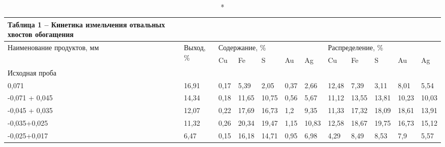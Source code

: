 {\small
\begin{longtable}[c]{|p{}lllllllllll|}
\caption*{Таблица 1 -- Кинетика измельчения отвальных хвостов обогащения} \\
\hline
\multicolumn{1}{|p{0.15\textwidth}|}{\multirow{2}{=}{Наименование продуктов, мм}} & \multicolumn{1}{p{0.06\textwidth}|}{\multirow{2}{=}{Выход, \%}} & \multicolumn{5}{l|}{Содержание, \%} & \multicolumn{5}{l|}{Распределение, \%} \\ \cline{3-12} 
\multicolumn{1}{|l|}{} & \multicolumn{1}{l|}{} & \multicolumn{1}{l|}{Cu} & \multicolumn{1}{l|}{Fe} & \multicolumn{1}{l|}{S} & \multicolumn{1}{l|}{Au} & \multicolumn{1}{l|}{Ag} & \multicolumn{1}{l|}{Cu} & \multicolumn{1}{l|}{Fe} & \multicolumn{1}{l|}{S} & \multicolumn{1}{l|}{Au} & Ag \\ \hline
\endfirsthead
%
\endhead
%
\multicolumn{12}{|l|}{Исходная проба} \\ \hline
\multicolumn{1}{|l|}{0,071} & \multicolumn{1}{l|}{16,91} & \multicolumn{1}{l|}{0,17} & \multicolumn{1}{l|}{5,39} & \multicolumn{1}{l|}{2,05} & \multicolumn{1}{l|}{0,37} & \multicolumn{1}{l|}{2,66} & \multicolumn{1}{l|}{12,48} & \multicolumn{1}{l|}{7,39} & \multicolumn{1}{l|}{3,11} & \multicolumn{1}{l|}{8,01} & 5,54 \\ \hline
\multicolumn{1}{|l|}{-0,071 + 0,045} & \multicolumn{1}{l|}{14,34} & \multicolumn{1}{l|}{0,18} & \multicolumn{1}{l|}{11,65} & \multicolumn{1}{l|}{10,75} & \multicolumn{1}{l|}{0,56} & \multicolumn{1}{l|}{5,67} & \multicolumn{1}{l|}{11,12} & \multicolumn{1}{l|}{13,55} & \multicolumn{1}{l|}{13,81} & \multicolumn{1}{l|}{10,23} & 10,03 \\ \hline
\multicolumn{1}{|l|}{-0,045 + 0,035} & \multicolumn{1}{l|}{12,07} & \multicolumn{1}{l|}{0,22} & \multicolumn{1}{l|}{17,69} & \multicolumn{1}{l|}{16,73} & \multicolumn{1}{l|}{1,2} & \multicolumn{1}{l|}{9,35} & \multicolumn{1}{l|}{11,33} & \multicolumn{1}{l|}{17,32} & \multicolumn{1}{l|}{18,09} & \multicolumn{1}{l|}{18,61} & 13,91 \\ \hline
\multicolumn{1}{|l|}{-0,035+0,025} & \multicolumn{1}{l|}{11,32} & \multicolumn{1}{l|}{0,26} & \multicolumn{1}{l|}{20,34} & \multicolumn{1}{l|}{19,47} & \multicolumn{1}{l|}{1,15} & \multicolumn{1}{l|}{10,83} & \multicolumn{1}{l|}{12,58} & \multicolumn{1}{l|}{18,67} & \multicolumn{1}{l|}{19,75} & \multicolumn{1}{l|}{16,73} & 15,12 \\ \hline
\multicolumn{1}{|l|}{-0,025+0,017} & \multicolumn{1}{l|}{6,47} & \multicolumn{1}{l|}{0,15} & \multicolumn{1}{l|}{16,18} & \multicolumn{1}{l|}{14,71} & \multicolumn{1}{l|}{0,95} & \multicolumn{1}{l|}{6,98} & \multicolumn{1}{l|}{4,29} & \multicolumn{1}{l|}{8,49} & \multicolumn{1}{l|}{8,53} & \multicolumn{1}{l|}{7,9} & 5,57 \\ \hline

\end{longtable}}
